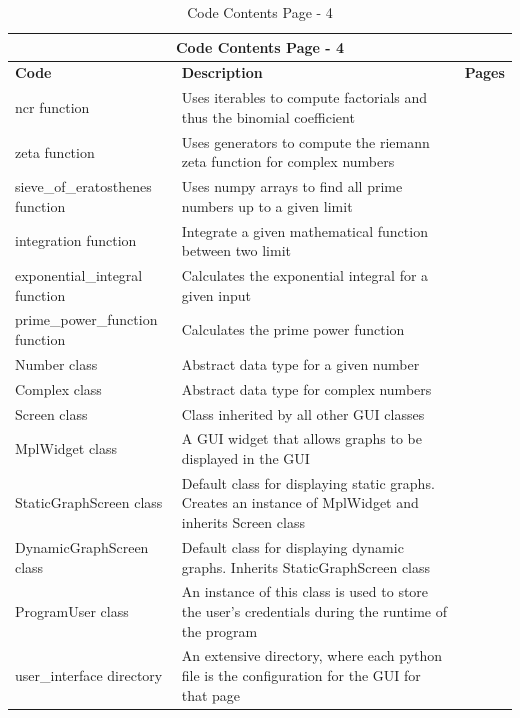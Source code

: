 \documentclass{article}
\begin{document}
\begin{table}[ht]
    \centering
    \begin{tabular}{ | p{0.33\linewidth} | p{0.57\linewidth} | p{0.1\linewidth} |}
    \hline
    \multicolumn{3}{|c|}{\textbf{Code Contents Page - 4}}\\
    \hline
    \hline
    \textbf{Code} & \textbf{Description} & \textbf{Pages}\\
    \hline
    ncr function & Uses iterables to compute factorials and thus the binomial coefficient &\\
    \hline
    zeta function & Uses generators to compute the riemann zeta function for complex numbers &\\
    \hline
    sieve\_of\_eratosthenes function & Uses numpy arrays to find all prime numbers up to a given limit &\\
    \hline
    integration function & Integrate a given mathematical function between two limit &\\
    \hline
    exponential\_integral \text{ } function & Calculates the exponential integral for a given input &\\
    \hline
    prime\_power\_function function & Calculates the prime power function &\\
    \hline
    Number class & Abstract data type for a given number &\\
    \hline
    Complex class & Abstract data type for complex numbers &\\
    \hline
    Screen class & Class inherited by all other GUI classes &\\
    \hline
    MplWidget class & A GUI widget that allows graphs to be displayed in the GUI &\\
    \hline
    StaticGraphScreen class & Default class for displaying static graphs. Creates an instance of MplWidget and inherits Screen class&\\
    \hline
    DynamicGraphScreen class & Default class for displaying dynamic graphs. Inherits StaticGraphScreen class& \\
    \hline
    ProgramUser class & An instance of this class is used to store the user's credentials during the runtime of the program & \\
    \hline
    user\_interface directory & An extensive directory, where each python file is the configuration for the GUI for that page & \\
    \hline
    \end{tabular}
    \caption{Code Contents Page - 4}
\end{table}
\end{document}
